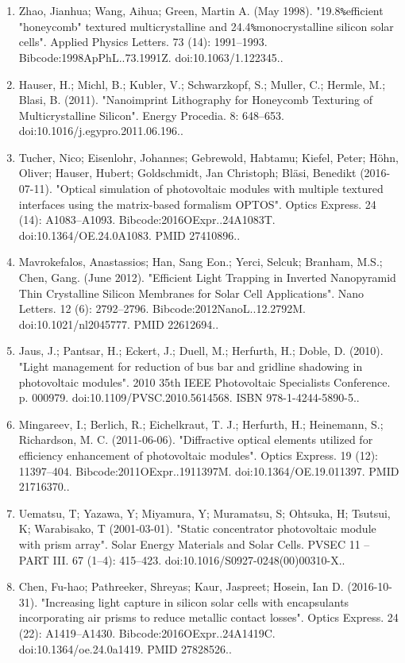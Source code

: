 \begin{enumerate}
\item Zhao, Jianhua; Wang, Aihua; Green, Martin A. (May 1998). "19.8\verb`%`efficient "honeycomb" textured multicrystalline and 24.4\verb`%`monocrystalline silicon solar cells". Applied Physics Letters. 73 (14): 1991–1993. Bibcode:1998ApPhL..73.1991Z. doi:10.1063/1.122345..
\item Hauser, H.; Michl, B.; Kubler, V.; Schwarzkopf, S.; Muller, C.; Hermle, M.; Blasi, B. (2011). "Nanoimprint Lithography for Honeycomb Texturing of Multicrystalline Silicon". Energy Procedia. 8: 648–653. doi:10.1016/j.egypro.2011.06.196..
\item Tucher, Nico; Eisenlohr, Johannes; Gebrewold, Habtamu; Kiefel, Peter; Höhn, Oliver; Hauser, Hubert; Goldschmidt, Jan Christoph; Bläsi, Benedikt (2016-07-11). "Optical simulation of photovoltaic modules with multiple textured interfaces using the matrix-based formalism OPTOS". Optics Express. 24 (14): A1083–A1093. Bibcode:2016OExpr..24A1083T. doi:10.1364/OE.24.0A1083. PMID 27410896..
\item Mavrokefalos, Anastassios; Han, Sang Eon.; Yerci, Selcuk; Branham, M.S.; Chen, Gang. (June 2012). "Efficient Light Trapping in Inverted Nanopyramid Thin Crystalline Silicon Membranes for Solar Cell Applications". Nano Letters. 12 (6): 2792–2796. Bibcode:2012NanoL..12.2792M. doi:10.1021/nl2045777. PMID 22612694..
\item Jaus, J.; Pantsar, H.; Eckert, J.; Duell, M.; Herfurth, H.; Doble, D. (2010). "Light management for reduction of bus bar and gridline shadowing in photovoltaic modules". 2010 35th IEEE Photovoltaic Specialists Conference. p. 000979. doi:10.1109/PVSC.2010.5614568. ISBN 978-1-4244-5890-5..
\item Mingareev, I.; Berlich, R.; Eichelkraut, T. J.; Herfurth, H.; Heinemann, S.; Richardson, M. C. (2011-06-06). "Diffractive optical elements utilized for efficiency enhancement of photovoltaic modules". Optics Express. 19 (12): 11397–404. Bibcode:2011OExpr..1911397M. doi:10.1364/OE.19.011397. PMID 21716370..
\item Uematsu, T; Yazawa, Y; Miyamura, Y; Muramatsu, S; Ohtsuka, H; Tsutsui, K; Warabisako, T (2001-03-01). "Static concentrator photovoltaic module with prism array". Solar Energy Materials and Solar Cells. PVSEC 11 – PART III. 67 (1–4): 415–423. doi:10.1016/S0927-0248(00)00310-X..
\item Chen, Fu-hao; Pathreeker, Shreyas; Kaur, Jaspreet; Hosein, Ian D. (2016-10-31). "Increasing light capture in silicon solar cells with encapsulants incorporating air prisms to reduce metallic contact losses". Optics Express. 24 (22): A1419–A1430. Bibcode:2016OExpr..24A1419C. doi:10.1364/oe.24.0a1419. PMID 27828526..

\end{enumerate}
